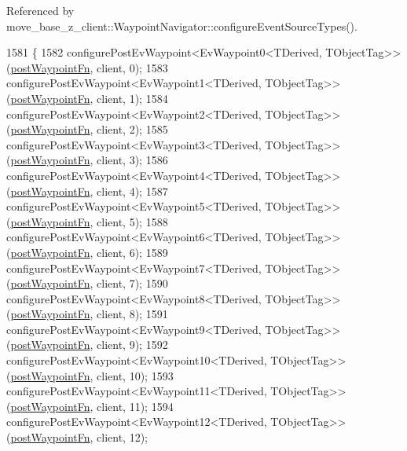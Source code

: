 Referenced by move\+\_\+base\+\_\+z\+\_\+client\+::\+Waypoint\+Navigator\+::configure\+Event\+Source\+Types().


\begin{DoxyCode}
1581 \{
1582     configurePostEvWaypoint<EvWaypoint0<TDerived, TObjectTag>>(\hyperlink{classmove__base__z__client_1_1WaypointEventDispatcher_acc538eb7506c13f7cca2268a1742dadd}{postWaypointFn}, client, 0);
1583     configurePostEvWaypoint<EvWaypoint1<TDerived, TObjectTag>>(\hyperlink{classmove__base__z__client_1_1WaypointEventDispatcher_acc538eb7506c13f7cca2268a1742dadd}{postWaypointFn}, client, 1);
1584     configurePostEvWaypoint<EvWaypoint2<TDerived, TObjectTag>>(\hyperlink{classmove__base__z__client_1_1WaypointEventDispatcher_acc538eb7506c13f7cca2268a1742dadd}{postWaypointFn}, client, 2);
1585     configurePostEvWaypoint<EvWaypoint3<TDerived, TObjectTag>>(\hyperlink{classmove__base__z__client_1_1WaypointEventDispatcher_acc538eb7506c13f7cca2268a1742dadd}{postWaypointFn}, client, 3);
1586     configurePostEvWaypoint<EvWaypoint4<TDerived, TObjectTag>>(\hyperlink{classmove__base__z__client_1_1WaypointEventDispatcher_acc538eb7506c13f7cca2268a1742dadd}{postWaypointFn}, client, 4);
1587     configurePostEvWaypoint<EvWaypoint5<TDerived, TObjectTag>>(\hyperlink{classmove__base__z__client_1_1WaypointEventDispatcher_acc538eb7506c13f7cca2268a1742dadd}{postWaypointFn}, client, 5);
1588     configurePostEvWaypoint<EvWaypoint6<TDerived, TObjectTag>>(\hyperlink{classmove__base__z__client_1_1WaypointEventDispatcher_acc538eb7506c13f7cca2268a1742dadd}{postWaypointFn}, client, 6);
1589     configurePostEvWaypoint<EvWaypoint7<TDerived, TObjectTag>>(\hyperlink{classmove__base__z__client_1_1WaypointEventDispatcher_acc538eb7506c13f7cca2268a1742dadd}{postWaypointFn}, client, 7);
1590     configurePostEvWaypoint<EvWaypoint8<TDerived, TObjectTag>>(\hyperlink{classmove__base__z__client_1_1WaypointEventDispatcher_acc538eb7506c13f7cca2268a1742dadd}{postWaypointFn}, client, 8);
1591     configurePostEvWaypoint<EvWaypoint9<TDerived, TObjectTag>>(\hyperlink{classmove__base__z__client_1_1WaypointEventDispatcher_acc538eb7506c13f7cca2268a1742dadd}{postWaypointFn}, client, 9);
1592     configurePostEvWaypoint<EvWaypoint10<TDerived, TObjectTag>>(\hyperlink{classmove__base__z__client_1_1WaypointEventDispatcher_acc538eb7506c13f7cca2268a1742dadd}{postWaypointFn}, client, 10);
1593     configurePostEvWaypoint<EvWaypoint11<TDerived, TObjectTag>>(\hyperlink{classmove__base__z__client_1_1WaypointEventDispatcher_acc538eb7506c13f7cca2268a1742dadd}{postWaypointFn}, client, 11);
1594     configurePostEvWaypoint<EvWaypoint12<TDerived, TObjectTag>>(\hyperlink{classmove__base__z__client_1_1WaypointEventDispatcher_acc538eb7506c13f7cca2268a1742dadd}{postWaypointFn}, client, 12);

\end{DoxyCode}
